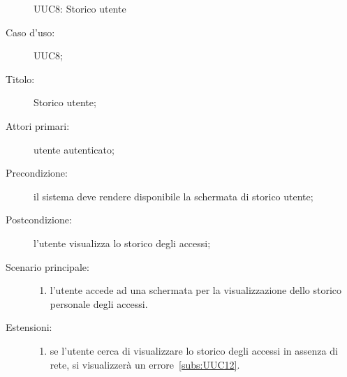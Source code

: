\documentclass[../../../analisi-dei-requisiti.tex]{subfiles}
\begin{document}
\begin{figure}[H]
  \centering
  \caption{UUC8: Storico utente}%
  \label{fig:uuc8}
\end{figure}

\begin{description}
  \item[Caso d’uso:] UUC8;
  \item[Titolo:] Storico utente;
  \item[Attori primari:] utente autenticato;
  \item[Precondizione:]  il sistema deve rendere disponibile la schermata di storico utente;
  \item[Postcondizione:] l'utente visualizza lo storico degli accessi;
  \item[Scenario principale:]
        \begin{enumerate}
          \item l'utente accede ad una schermata per la visualizzazione dello storico personale degli accessi.
        \end{enumerate}
  \item[Estensioni:]
        \begin{enumerate}
          \item se l'utente cerca di visualizzare lo storico degli accessi in assenza di rete, si visualizzerà un errore~\ref{subs:UUC12}.
        \end{enumerate}
\end{description}
\end{document}
